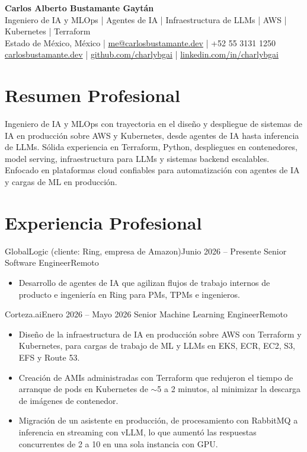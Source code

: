 \documentclass[10pt,letterpaper]{article}
\begin{document}
\begin{center}
    {\LARGE \textbf{Carlos Alberto Bustamante Gaytán}} \\[-1pt]
    Ingeniero de IA y MLOps | Agentes de IA | Infraestructura de LLMs | AWS | Kubernetes | Terraform \\[2pt]
    Estado de México, México |
    \href{mailto:me@carlosbustamante.dev}{me@carlosbustamante.dev} |
    +52 55 3131 1250 \\
    \href{https://carlosbustamante.dev}{carlosbustamante.dev} |
    \href{https://github.com/charlybgai}{github.com/charlybgai} |
    \href{https://linkedin.com/in/charlybgai}{linkedin.com/in/charlybgai}
\end{center}

\section*{Resumen Profesional}
Ingeniero de IA y MLOps con trayectoria en el diseño y despliegue de sistemas de IA en producción sobre AWS y Kubernetes, desde agentes de IA hasta inferencia de LLMs. Sólida experiencia en Terraform, Python, despliegues en contenedores, model serving, infraestructura para LLMs y sistemas backend escalables. Enfocado en plataformas cloud confiables para automatización con agentes de IA y cargas de ML en producción.

\section*{Experiencia Profesional}

\entry
{GlobalLogic (cliente: Ring, empresa de Amazon)}{Junio 2026 -- Presente}
{Senior Software Engineer}{Remoto}
\begin{itemize}
  \item Desarrollo de agentes de IA que agilizan flujos de trabajo internos de producto e ingeniería en Ring para PMs, TPMs e ingenieros.
\end{itemize}

\entry
{Corteza.ai}{Enero 2026 -- Mayo 2026}
{Senior Machine Learning Engineer}{Remoto}
\begin{itemize}
  \item Diseño de la infraestructura de IA en producción sobre AWS con Terraform y Kubernetes, para cargas de trabajo de ML y LLMs en EKS, ECR, EC2, S3, EFS y Route 53.
  \item Creación de AMIs administradas con Terraform que redujeron el tiempo de arranque de pods en Kubernetes de $\sim$5 a 2 minutos, al minimizar la descarga de imágenes de contenedor.
  \item Migración de un asistente en producción, de procesamiento con RabbitMQ a inferencia en streaming con vLLM, lo que aumentó las respuestas concurrentes de 2 a 10 en una sola instancia con GPU.
\end{itemize}
\end{document}
